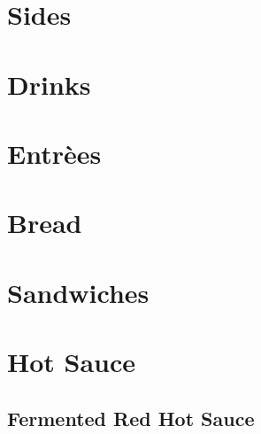 \chapter{Sides}
\minitoc
\clearpage



\chapter{Drinks}
\minitoc
\clearpage



\chapter{Entr\`{e}es}
\minitoc
\clearpage











\chapter{Bread}
\minitoc
\clearpage



\chapter{Sandwiches}
\minitoc
\clearpage


\chapter{Hot Sauce}
\minitoc
\clearpage
{

	\section[Red Hot Sauce]{Fermented Red Hot Sauce}
	\let\section\subsection
	\let\subsection\subsubsection
	
	
}

